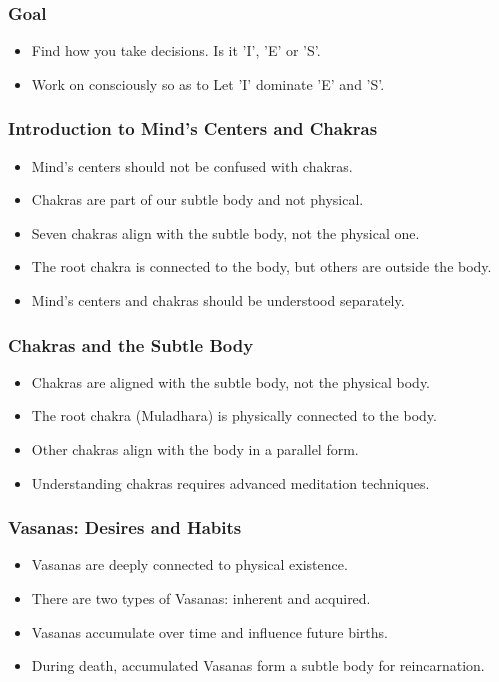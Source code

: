 \begin{frame}[fragile]\frametitle{Goal}

\begin{itemize}
\item Find how you take decisions. Is it 'I', 'E' or 'S'.
\item Work on consciously so as to Let 'I' dominate 'E' and 'S'.
\end{itemize}

\end{frame}

\begin{frame}[fragile]\frametitle{Introduction to Mind's Centers and Chakras}
  \begin{itemize}
    \item Mind's centers should not be confused with chakras.
    \item Chakras are part of our subtle body and not physical.
    \item Seven chakras align with the subtle body, not the physical one.
    \item The root chakra is connected to the body, but others are outside the body.
    \item Mind's centers and chakras should be understood separately.
  \end{itemize}
\end{frame}

\begin{frame}\frametitle{Chakras and the Subtle Body}
  \begin{itemize}
    \item Chakras are aligned with the subtle body, not the physical body.
    \item The root chakra (Muladhara) is physically connected to the body.
    \item Other chakras align with the body in a parallel form.
    \item Understanding chakras requires advanced meditation techniques.
  \end{itemize}
\end{frame}

\begin{frame}\frametitle{Vasanas: Desires and Habits}
  \begin{itemize}
    \item Vasanas are deeply connected to physical existence.
    \item There are two types of Vasanas: inherent and acquired.
    \item Vasanas accumulate over time and influence future births.
    \item During death, accumulated Vasanas form a subtle body for reincarnation.
  \end{itemize}
\end{frame}

